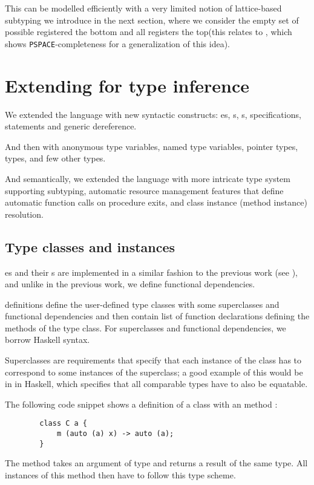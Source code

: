This can be modelled efficiently with a very limited notion of lattice-based subtyping we introduce in the next section, where we consider the empty set of possible registered the bottom and all registers the top(this relates to \cite{tiuryn1992subtype}, which shows \texttt{PSPACE}-completeness for a generalization of this idea).

\section{Extending \cmm{} for type inference}

We extended the language with new syntactic constructs: es, s, s,  specifications,  statements and \li{[ptr]} generic dereference.

And then with  anonymous type variables,  named type variables,  pointer types,  types, and few other types.

And semantically, we extended the language with more intricate type system supporting subtyping, automatic resource management features that define automatic function calls on procedure exits, and class instance (method instance) resolution.

\subsection{Type classes and instances}

es and their s are implemented in a similar fashion to the previous work (see \cite{klepl2020type}), and unlike in the previous work, we define functional dependencies.

 definitions define the user-defined type classes with some superclasses and functional dependencies and then contain list of function declarations defining the methods of the type class. For superclasses and functional dependencies, we borrow Haskell syntax.

Superclasses are requirements that specify that each instance of the class has to correspond to some instances of the superclass; a good example of this would be  in  in Haskell, which specifies that all comparable types have to also be equatable.

\begin{ex}[Classes]
    The following code snippet shows a definition of a class  with an method :

    \begin{lstlisting}
        class C a {
            m (auto (a) x) -> auto (a);
        }
    \end{lstlisting}

    The method  takes an argument of type  and returns a result of the same type. All instances of this method then have to follow this type scheme.
\end{ex}

